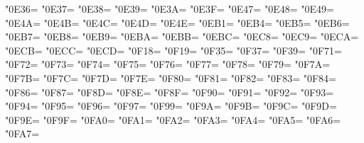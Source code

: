 \XeTeXcharclass"0E36=\KclassNum
\XeTeXcharclass"0E37=\KclassNum
\XeTeXcharclass"0E38=\KclassNum
\XeTeXcharclass"0E39=\KclassNum
\XeTeXcharclass"0E3A=\KclassNum
\XeTeXcharclass"0E3F=\KclassNum
\XeTeXcharclass"0E47=\KclassNum
\XeTeXcharclass"0E48=\KclassNum
\XeTeXcharclass"0E49=\KclassNum
\XeTeXcharclass"0E4A=\KclassNum
\XeTeXcharclass"0E4B=\KclassNum
\XeTeXcharclass"0E4C=\KclassNum
\XeTeXcharclass"0E4D=\KclassNum
\XeTeXcharclass"0E4E=\KclassNum
\XeTeXcharclass"0EB1=\KclassNum
\XeTeXcharclass"0EB4=\KclassNum
\XeTeXcharclass"0EB5=\KclassNum
\XeTeXcharclass"0EB6=\KclassNum
\XeTeXcharclass"0EB7=\KclassNum
\XeTeXcharclass"0EB8=\KclassNum
\XeTeXcharclass"0EB9=\KclassNum
\XeTeXcharclass"0EBA=\KclassNum
\XeTeXcharclass"0EBB=\KclassNum
\XeTeXcharclass"0EBC=\KclassNum
\XeTeXcharclass"0EC8=\KclassNum
\XeTeXcharclass"0EC9=\KclassNum
\XeTeXcharclass"0ECA=\KclassNum
\XeTeXcharclass"0ECB=\KclassNum
\XeTeXcharclass"0ECC=\KclassNum
\XeTeXcharclass"0ECD=\KclassNum
\XeTeXcharclass"0F18=\KclassNum
\XeTeXcharclass"0F19=\KclassNum
\XeTeXcharclass"0F35=\KclassNum
\XeTeXcharclass"0F37=\KclassNum
\XeTeXcharclass"0F39=\KclassNum
\XeTeXcharclass"0F71=\KclassNum
\XeTeXcharclass"0F72=\KclassNum
\XeTeXcharclass"0F73=\KclassNum
\XeTeXcharclass"0F74=\KclassNum
\XeTeXcharclass"0F75=\KclassNum
\XeTeXcharclass"0F76=\KclassNum
\XeTeXcharclass"0F77=\KclassNum
\XeTeXcharclass"0F78=\KclassNum
\XeTeXcharclass"0F79=\KclassNum
\XeTeXcharclass"0F7A=\KclassNum
\XeTeXcharclass"0F7B=\KclassNum
\XeTeXcharclass"0F7C=\KclassNum
\XeTeXcharclass"0F7D=\KclassNum
\XeTeXcharclass"0F7E=\KclassNum
\XeTeXcharclass"0F80=\KclassNum
\XeTeXcharclass"0F81=\KclassNum
\XeTeXcharclass"0F82=\KclassNum
\XeTeXcharclass"0F83=\KclassNum
\XeTeXcharclass"0F84=\KclassNum
\XeTeXcharclass"0F86=\KclassNum
\XeTeXcharclass"0F87=\KclassNum
\XeTeXcharclass"0F8D=\KclassNum
\XeTeXcharclass"0F8E=\KclassNum
\XeTeXcharclass"0F8F=\KclassNum
\XeTeXcharclass"0F90=\KclassNum
\XeTeXcharclass"0F91=\KclassNum
\XeTeXcharclass"0F92=\KclassNum
\XeTeXcharclass"0F93=\KclassNum
\XeTeXcharclass"0F94=\KclassNum
\XeTeXcharclass"0F95=\KclassNum
\XeTeXcharclass"0F96=\KclassNum
\XeTeXcharclass"0F97=\KclassNum
\XeTeXcharclass"0F99=\KclassNum
\XeTeXcharclass"0F9A=\KclassNum
\XeTeXcharclass"0F9B=\KclassNum
\XeTeXcharclass"0F9C=\KclassNum
\XeTeXcharclass"0F9D=\KclassNum
\XeTeXcharclass"0F9E=\KclassNum
\XeTeXcharclass"0F9F=\KclassNum
\XeTeXcharclass"0FA0=\KclassNum
\XeTeXcharclass"0FA1=\KclassNum
\XeTeXcharclass"0FA2=\KclassNum
\XeTeXcharclass"0FA3=\KclassNum
\XeTeXcharclass"0FA4=\KclassNum
\XeTeXcharclass"0FA5=\KclassNum
\XeTeXcharclass"0FA6=\KclassNum
\XeTeXcharclass"0FA7=\KclassNum
